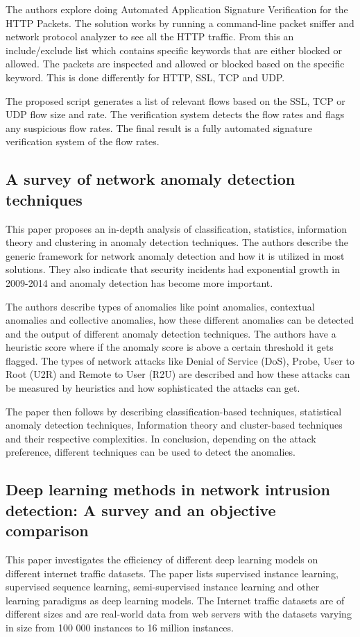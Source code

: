 \documentclass[a4paper, onecolumn, 12pt]{IEEEtran}
\begin{document}
The authors explore doing Automated Application Signature Verification for the HTTP Packets. The solution works by running a command-line packet sniffer and network protocol analyzer to see all the HTTP traffic. From this an include/exclude list which contains specific keywords that are either blocked or allowed. The packets are inspected and allowed or blocked based on the specific keyword. This is done differently for HTTP, SSL, TCP and UDP.

The proposed script generates a list of relevant flows based on the SSL, TCP or UDP flow size and rate. The verification system detects the flow rates and flags any suspicious flow rates. The final result is a fully automated signature verification system of the flow rates.


\subsection{A survey of network anomaly detection techniques \cite{AHMED201619}}
This paper proposes an in-depth analysis of classification, statistics, information theory and clustering in anomaly detection techniques. The authors describe the generic framework for network anomaly detection and how it is utilized in most solutions. They also indicate that security incidents had exponential growth in 2009-2014 and anomaly detection has become more important.

The authors describe types of anomalies like point anomalies, contextual anomalies and collective anomalies, how these different anomalies can be detected and the output of different anomaly detection techniques. The authors have a heuristic score where if the anomaly score is above a certain threshold it gets flagged. The types of network attacks like Denial of Service (DoS), Probe, User to Root (U2R) and Remote to User (R2U) are described and how these attacks can be measured by heuristics and how sophisticated the attacks can get.

The paper then follows by describing classification-based techniques, statistical anomaly detection techniques, Information theory and cluster-based techniques and their respective complexities. In conclusion, depending on the attack preference, different techniques can be used to detect the anomalies.


\subsection{Deep learning methods in network intrusion detection: A survey and an objective comparison \cite{GAMAGE2020102767}}
This paper investigates the efficiency of different deep learning models on different internet traffic datasets. The paper lists supervised instance learning, supervised sequence learning, semi-supervised instance learning and other learning paradigms as deep learning models. The Internet traffic datasets are of different sizes and are real-world data from web servers with the datasets varying in size from 100 000 instances to 16 million instances.
\end{document}
